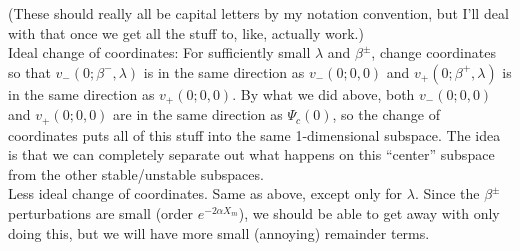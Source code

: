 \documentclass[12pt]{article}
\begin{document}
(These should really all be capital letters by my notation convention, but I'll deal with that once we get all the stuff to, like, actually work.)\\

Ideal change of coordinates: For sufficiently small $\lambda$ and $\beta^\pm$, change coordinates so that $v_-(0; \beta^-, \lambda)$ is in the same direction as $v_-(0; 0, 0)$ and $v_+(0; \beta^+, \lambda)$ is in the same direction as $v_+(0; 0, 0)$. By what we did above, both $v_-(0; 0, 0)$ and $v_+(0; 0, 0)$ are in the same direction as $\Psi_c(0)$, so the change of coordinates puts all of this stuff into the same 1-dimensional subspace. The idea is that we can completely separate out what happens on this ``center'' subspace from the other stable/unstable subspaces.\\

Less ideal change of coordinates. Same as above, except only for $\lambda$. Since the $\beta^\pm$ perturbations are small (order $e^{-2\alpha X_m}$), we should be able to get away with only doing this, but we will have more small (annoying) remainder terms.
\end{document}
